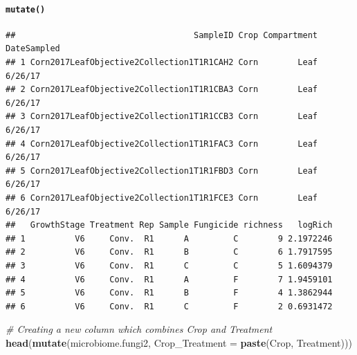 \documentclass[
]{article}
\newenvironment{Shaded}{\begin{snugshade}}{\end{snugshade}}
\newcommand{\AttributeTok}[1]{\textcolor[rgb]{0.13,0.29,0.53}{#1}}
\newcommand{\CommentTok}[1]{\textcolor[rgb]{0.56,0.35,0.01}{\textit{#1}}}
\newcommand{\FunctionTok}[1]{\textcolor[rgb]{0.13,0.29,0.53}{\textbf{#1}}}
\newcommand{\NormalTok}[1]{#1}
\newcommand{\OtherTok}[1]{\textcolor[rgb]{0.56,0.35,0.01}{#1}}
\newcommand{\SpecialCharTok}[1]{\textcolor[rgb]{0.81,0.36,0.00}{\textbf{#1}}}
\begin{document}
\paragraph{\texorpdfstring{\texttt{mutate()}}{mutate()}}\label{mutate}

\begin{Shaded}
\end{Shaded}

\begin{verbatim}
##                                    SampleID Crop Compartment DateSampled
## 1 Corn2017LeafObjective2Collection1T1R1CAH2 Corn        Leaf     6/26/17
## 2 Corn2017LeafObjective2Collection1T1R1CBA3 Corn        Leaf     6/26/17
## 3 Corn2017LeafObjective2Collection1T1R1CCB3 Corn        Leaf     6/26/17
## 4 Corn2017LeafObjective2Collection1T1R1FAC3 Corn        Leaf     6/26/17
## 5 Corn2017LeafObjective2Collection1T1R1FBD3 Corn        Leaf     6/26/17
## 6 Corn2017LeafObjective2Collection1T1R1FCE3 Corn        Leaf     6/26/17
##   GrowthStage Treatment Rep Sample Fungicide richness   logRich
## 1          V6     Conv.  R1      A         C        9 2.1972246
## 2          V6     Conv.  R1      B         C        6 1.7917595
## 3          V6     Conv.  R1      C         C        5 1.6094379
## 4          V6     Conv.  R1      A         F        7 1.9459101
## 5          V6     Conv.  R1      B         F        4 1.3862944
## 6          V6     Conv.  R1      C         F        2 0.6931472
\end{verbatim}

\begin{Shaded}
\begin{Highlighting}[]
\CommentTok{\# Creating a new column which combines Crop and Treatment }
\FunctionTok{head}\NormalTok{(}\FunctionTok{mutate}\NormalTok{(microbiome.fungi2, }\AttributeTok{Crop\_Treatment =} \FunctionTok{paste}\NormalTok{(Crop, Treatment)))}
\end{Highlighting}
\end{Shaded}
\end{document}

